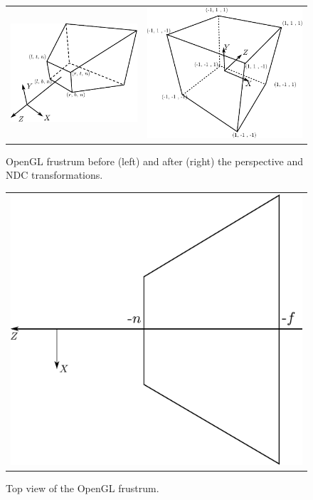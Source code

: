 \begin{figure}[t]
 \begin{tabular}{cc}
  \includegraphics[width=0.48\columnwidth]{./img/ch-camera/openglcam01}&
  \includegraphics[width=0.48\columnwidth]{./img/ch-camera/openglcam02}
 \end{tabular}
 \caption{OpenGL frustrum before (left) and after (right) the perspective and NDC transformations.}
 \label{fig:perspective}
\end{figure}

\begin{figure}[t]
 \begin{tabular}{c}
  \includegraphics[width=0.78\columnwidth]{./img/ch-camera/openglcam03}
 \end{tabular}
 \caption{Top view of the OpenGL frustrum.}
 \label{fig:frustrumTop}
\end{figure}
